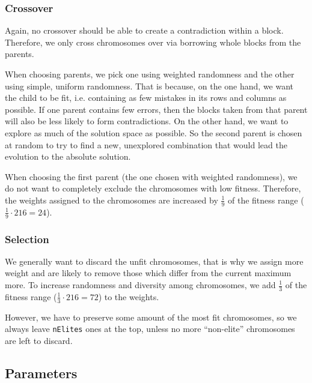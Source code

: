 \documentclass[10pt]{article}
\begin{document}
\subsubsection{Crossover}
Again, no crossover should be able to create a contradiction within a block. Therefore,
we only cross chromosomes over via borrowing whole blocks from the parents.

When choosing parents, we pick one using weighted randomness and the other using
simple, uniform randomness. That is because, on the one hand, we want the child
to be fit, i.e. containing as few mistakes in its rows and columns as possible.
If one parent contains few errors, then the blocks taken from that parent will also
be less likely to form contradictions.
On the other hand, we want to explore as much of the solution space as possible.
So the second parent is chosen at random to try to find a new, unexplored combination
that would lead the evolution to the absolute solution.

When choosing the first parent (the one chosen with weighted randomness), we do
not want to completely exclude the chromosomes with low fitness. Therefore, the
weights assigned to the chromosomes are increased by $\frac19$ of the fitness range ($\frac19\cdot216=24$).

\subsubsection{Selection}
We generally want to discard the unfit chromosomes, that is why we assign more
weight and are likely to remove those which differ from the current maximum more.
To increase randomness and diversity among chromosomes, we add $\frac13$ of the
fitness range ($\frac13\cdot216=72$) to the weights.

However, we have to preserve some amount of the most fit chromosomes, so we always
leave \texttt{nElites} ones at the top, unless no more ``non-elite'' chromosomes
are left to discard.

\subsection{Parameters}
\end{document}
